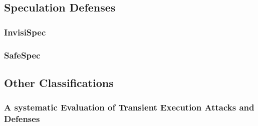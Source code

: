 \subsection{Speculation Defenses}
\subsubsection{InvisiSpec \cite{b46}}
\subsubsection{SafeSpec \cite{b29}}

\subsection{Other Classifications}
\subsubsection{A systematic Evaluation of Transient Execution Attacks and Defenses \cite{b48}}

